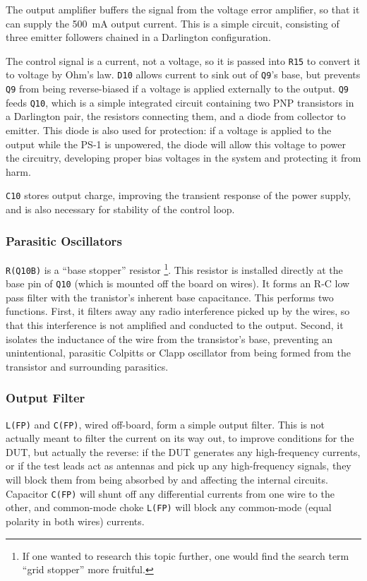 \begin{multicols}{2}

The output amplifier buffers the signal from the voltage error amplifier, so
that it can supply the 500~mA output current. This is a simple circuit,
consisting of three emitter followers chained in a Darlington configuration.

The control signal is a current, not a voltage, so it is passed into
\texttt{R15} to convert it to voltage by Ohm's law. \texttt{D10} allows
current to sink out of \texttt{Q9}'s base, but prevents \texttt{Q9} from
being reverse-biased if a voltage is applied externally to the output.
\texttt{Q9} feeds \texttt{Q10}, which is a simple integrated circuit containing
two PNP transistors in a Darlington pair, the resistors connecting them, and a
diode from collector to emitter. This diode is also used for protection: if
a voltage is applied to the output while the PS-1 is unpowered, the diode will
allow this voltage to power the circuitry, developing proper bias voltages in
the system and protecting it from harm.

\texttt{C10} stores output charge, improving the transient response of the
power supply, and is also necessary for stability of the control loop.

\subsubsection{Parasitic Oscillators}
\texttt{R(Q10B)} is a ``base stopper'' resistor%
\footnote{If one wanted to research this topic further, one would find the
search term ``grid stopper'' more fruitful.}.
This resistor is installed directly at the base pin of \texttt{Q10}
(which is mounted off the board on wires). It forms an R-C low pass filter
with the tranistor's inherent base capacitance. This performs two functions.
First, it filters away any radio interference picked up by the wires, so that
this interference is not amplified and conducted to the output. Second, it
isolates the inductance of the wire from the transistor's base, preventing
an unintentional, parasitic Colpitts or Clapp oscillator from being formed from
the transistor and surrounding parasitics.

\subsubsection{Output Filter}
\texttt{L(FP)} and \texttt{C(FP)}, wired off-board, form a simple output
filter. This is not actually meant to filter the current on its way out, to
improve conditions for the DUT, but actually the reverse: if the DUT generates
any high-frequency currents, or if the test leads act as antennas and pick up
any high-frequency signals, they will block them from being absorbed by and
affecting the internal circuits. Capacitor \texttt{C(FP)} will shunt off any
differential currents from one wire to the other, and common-mode choke
\texttt{L(FP)} will block any common-mode (equal polarity in both wires)
currents.


\end{multicols}
